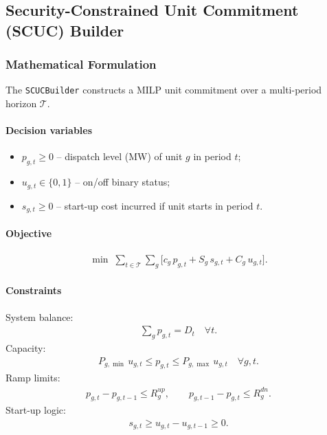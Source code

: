 \subsection{Security-Constrained Unit Commitment (SCUC) Builder}
\label{sec:scuc-builder}

\subsubsection{Mathematical Formulation}

The \texttt{SCUCBuilder} constructs a MILP unit commitment over a
multi-period horizon $\mathcal{T}$.

\paragraph{Decision variables}
\begin{itemize}
  \item $p_{g,t} \ge 0$ -- dispatch level (MW) of unit $g$ in period $t$;
  \item $u_{g,t} \in \{0,1\}$ -- on/off binary status;
  \item $s_{g,t} \ge 0$ -- start-up cost incurred if unit starts in period $t$.
\end{itemize}

\paragraph{Objective}
\begin{align}
\min\;\sum_{t\in\mathcal{T}}\sum_{g}\bigl[c_g\,p_{g,t} + S_g\,s_{g,t} + C_g\,u_{g,t}\bigr].
\end{align}

\paragraph{Constraints}
System balance:
\begin{align}
\sum_g p_{g,t} = D_t\quad \forall t.
\end{align}
Capacity:
\begin{align}
P_{g,\min}\,u_{g,t} \le p_{g,t} \le P_{g,\max}\,u_{g,t}\quad \forall g,t.
\end{align}
Ramp limits:
\begin{align}
p_{g,t} - p_{g,t-1} \le R_g^{up},\qquad p_{g,t-1} - p_{g,t} \le R_g^{dn}.
\end{align}
Start-up logic:
\begin{align}
s_{g,t} \ge u_{g,t} - u_{g,t-1}\ge 0.
\end{align}

